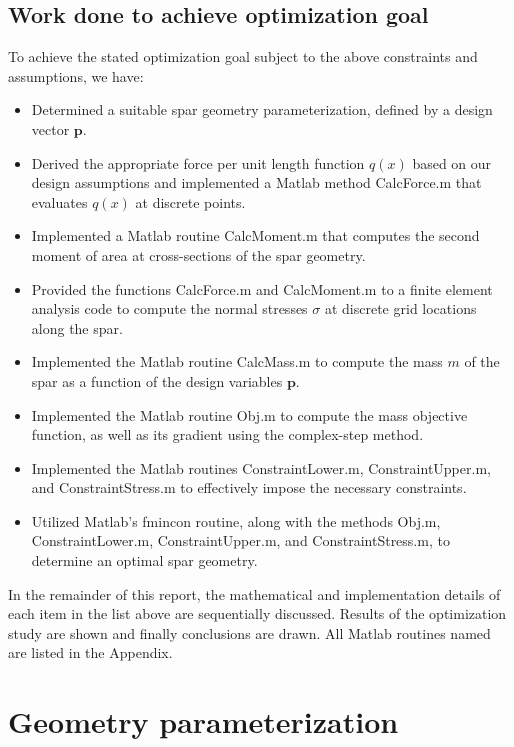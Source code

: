 \documentclass[11pt]{article}
\newcommand{\bs}[1] {\boldsymbol{#1}}
\begin{document}
\subsection{Work done to achieve optimization goal}

To achieve the stated optimization goal subject to the above
constraints and assumptions, we have:
\begin{itemize}
\item Determined a suitable spar geometry parameterization,
defined by a design vector $\bs{p}$.
\item Derived the appropriate force per unit length function
$q(x)$ based on our design assumptions and implemented a Matlab
method CalcForce.m that evaluates $q(x)$ at discrete points.
\item Implemented a Matlab routine CalcMoment.m that computes
the second moment of area at cross-sections of the spar geometry.
\item Provided the functions CalcForce.m and CalcMoment.m to a
finite element analysis code to compute the normal stresses
$\sigma$ at discrete grid locations along the spar.
\item Implemented the Matlab routine CalcMass.m to compute
the mass $m$ of the spar as a function of the design variables
$\bs{p}$.
\item Implemented the Matlab routine Obj.m to compute the
mass objective function, as well as its gradient using
the complex-step method.
\item Implemented the Matlab routines ConstraintLower.m,
ConstraintUpper.m, and ConstraintStress.m to effectively
impose the necessary constraints.
\item Utilized Matlab's fmincon routine, along with the methods
Obj.m, ConstraintLower.m, ConstraintUpper.m, and ConstraintStress.m,
to determine an optimal spar geometry.
\end{itemize}

In the remainder of this report, the mathematical and
implementation details of each item
in the list above are sequentially discussed.
Results of the optimization study are shown and finally
conclusions are drawn. All Matlab routines named are listed
in the Appendix.

\section{Geometry parameterization}
\end{document}
